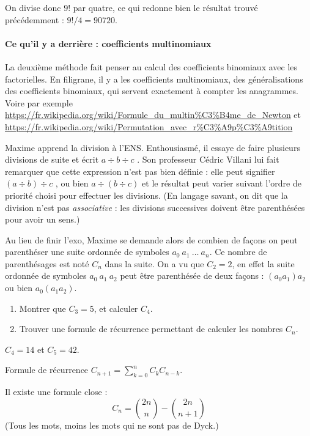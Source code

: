 \begin{exo}[Anagrammes]
\begin{sol}
On divise donc $9!$ par quatre, ce qui redonne bien le résultat trouvé précédemment : $9!/4 = 90720$.


\paragraph{Ce qu'il y a derrière :  coefficients multinomiaux} La deuxième méthode fait penser au calcul des coefficients binomiaux avec les factorielles. En filigrane, il y a les coefficients multinomiaux, des généralisations des coefficients binomiaux, qui servent exactement à compter les anagrammes. Voire par exemple \url{https://fr.wikipedia.org/wiki/Formule_du_multin%C3%B4me_de_Newton}
 et \url{https://fr.wikipedia.org/wiki/Permutation_avec_r%C3%A9p%C3%A9tition}
\end{sol}
\end{exo}






\begin{exo}
Maxime apprend la division à l'ENS. Enthousiasmé, il essaye de faire plusieurs divisions de suite et écrit \og $ a\div b \div c$ \fg. Son professeur Cédric Villani lui fait remarquer que cette expression n'est pas bien définie : elle peut signifier \og$(a\div b)\div c$ \fg, ou bien \og $a\div (b\div c)$ \fg{} et le résultat peut varier suivant l'ordre de priorité choisi pour effectuer les divisions. (En langage savant, on dit que la division n'est pas \emph{associative} : les divisions successives doivent être parenthésées pour avoir un sens.)

Au lieu de finir l'exo, Maxime se demande alors de combien de façons on peut parenthéser une suite ordonnée de symboles \og$a_0~a_1~\dots ~ a_n$\fg. Ce nombre de parenthésages est noté $C_n$ dans la suite. On a vu que $C_2 = 2$, en effet la suite ordonnée de symboles \og $a_0~a_1~a_2$\fg{} peut être parenthésée de deux façons : $(a_0a_1)a_2$ ou bien $a_0(a_1a_2)$.

\begin{enumerate}
\item Montrer que $C_3 = 5$, et calculer $C_4$.
\item Trouver une formule de récurrence permettant de calculer les nombres $C_n$.
\end{enumerate} 

\begin{sol} %
$C_4=14$ et $C_5=42$.

Formule de récurrence $C_{n+1} = \sum_{k=0}^n C_kC_{n-k}$.

Il existe une formule close : 
\[ C_n = \binom{2n}{n} - \binom{2n}{n+1}\]
(Tous les mots, moins les mots qui ne sont pas de Dyck.)
\end{sol}
\end{exo}

